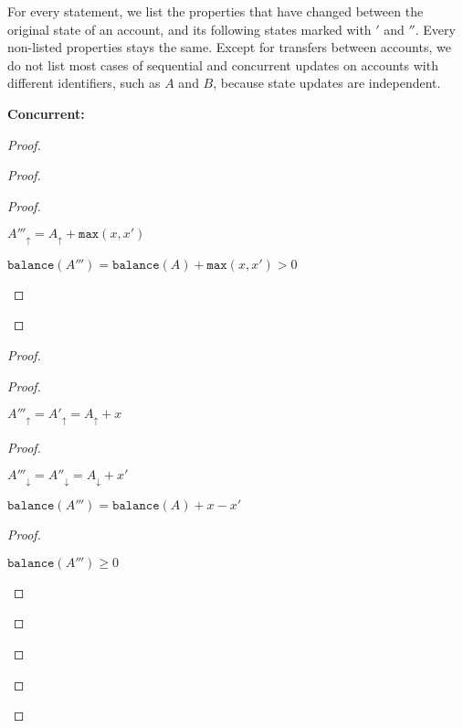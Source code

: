 \documentclass[9pt, oneside]{article}   	%
\begin{document}
For every statement, we list the properties that have changed between the original state of an account, and its following states marked with $'$ and $''$. Every non-listed properties stays the same. Except for transfers between accounts, we do not list most cases of sequential and concurrent updates on accounts with different identifiers, such as $A$ and $B$, because state updates are independent.


\textbf{Concurrent:}	
\begin{proof}
	\begin{proof}
		\begin{proof}
			\begin{pfenum}
				\item $A'''_\uparrow = A_\uparrow + \texttt{max}(x,x')$
				\item $\texttt{balance}(A''') = \texttt{balance}(A) + \texttt{max}(x,x') > 0$
			\end{pfenum}
		\end{proof}
	\end{proof}
	
	\begin{proof}
		\begin{proof}
			\begin{pfenum}
				\item $A'''_\uparrow = A'_\uparrow = A_\uparrow + x$
			\end{pfenum}
			
			\begin{proof}
				\begin{pfenum}
					\item $A'''_\downarrow = A''_\downarrow = A_\downarrow + x'$	
					\item $\texttt{balance}(A''') = \texttt{balance}(A) + x - x'$	
				\end{pfenum}
				
				\begin{proof}
					\begin{pfenum}
						\item $\texttt{balance}(A''') \geq 0$
					\end{pfenum}
				\end{proof}
				

\end{proof}
\end{proof}
\end{proof}
\end{proof}
\end{document}
